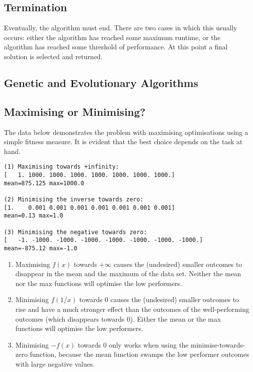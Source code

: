 \subsection{Termination}
Eventually, the algorithm must end. There are two cases in which this usually occurs: either the algorithm has reached some maximum runtime, or the algorithm has reached some threshold of performance. At this point a final solution is selected and returned.

\subsection{Genetic and Evolutionary Algorithms}






\subsection{Maximising or Minimising?}


The data below demonstrates the problem with maximising optimisations using a simple fitness measure. It is evident that the best choice depends on the task at hand.

\begin{lstlisting}
(1) Maximising towards +infinity:
[   1. 1000. 1000. 1000. 1000. 1000. 1000. 1000.] 
mean=875.125 max=1000.0

(2) Minimising the inverse towards zero:
[1.    0.001 0.001 0.001 0.001 0.001 0.001 0.001] 
mean=0.13 max=1.0

(3) Minimising the negative towards zero:
[   -1. -1000. -1000. -1000. -1000. -1000. -1000. -1000.] 
mean=-875.12 max=-1.0
\end{lstlisting}
\begin{enumerate}
\item Maximising $f(x)$ towards $+\infty$ causes the (undesired) smaller outcomes to disappear in the mean and the maximum of the data set.  Neither the mean nor the max functions will optimise the low performers.

\item  Minimising $f(1/x)$ towards 0 causes the (undesired) smaller outcomes to rise and have a much stronger effect than the outcomes of the well-performing outcomes (which disappears towards 0). Either the mean or the max functions will optimise the low performers.

\item  Minimising $-f(x)$ towards 0 only works when using the minimise-towards-zero function, because the mean function swamps the low performer outcomes with large negative values.

\end{enumerate}


